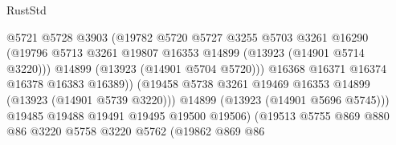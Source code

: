 \begin{lexlean}{RustStd}
\begin{coremodule}
                                            @5721
                                            @5728
                                            @3903
                                            (@19782
                                              @5720
                                              @5727
                                              @3255
                                              @5703
                                              @3261
                                              @16290
                                              (@19796
                                                @5713
                                                @3261
                                                @19807
                                                @16353
                                                @14899
                                                (@13923 (@14901 @5714 @3220)))
                                              @14899
                                              (@13923 (@14901 @5704 @5720)))
                                            @16368
                                            @16371
                                            @16374
                                            @16378
                                            @16383
                                            @16389))
                                        (@19458
                                          @5738
                                          @3261
                                          @19469
                                          @16353
                                          @14899
                                          (@13923 (@14901 @5739 @3220)))
                                        @14899
                                        (@13923 (@14901 @5696 @5745)))
                                      @19485
                                      @19488
                                      @19491
                                      @19495
                                      @19500
                                      @19506)
                                    (@19513
                                      @5755
                                      @869
                                      @880
                                      @86
                                      @3220
                                      @5758
                                      @3220
                                      @5762
                                      (@19862
                                        @869
                                        @86

\end{coremodule}
\end{lexlean}
